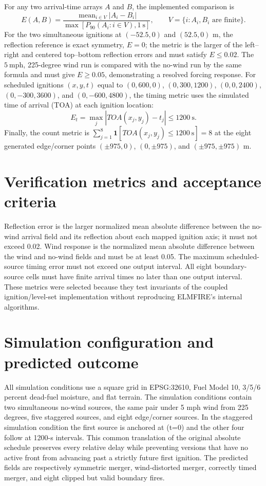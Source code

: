 For any two arrival-time arrays \(A\) and \(B\), the implemented comparison is
\[
 E(A,B)=\frac{\operatorname{mean}_{i\in V}|A_i-B_i|}
 {\max[P_{90}(A_i:i\in V),1~\mathrm{s}]},
 \qquad V=\{i:A_i,B_i\text{ are finite}\}.
\]
For the two simultaneous ignitions at \((-52.5,0)\) and \((52.5,0)\) m,
the reflection reference is exact symmetry, \(E=0\); the metric is the
larger of the left--right and centered top--bottom reflection errors and
must satisfy \(E\leq0.02\).  The \(5~\mathrm{mph}\), 225-degree wind run
is compared with the no-wind run by the same formula and must give
\(E\geq0.05\), demonstrating a resolved forcing response.
For scheduled ignitions \((x,y,t)\) equal to
\((0,600,0)\), \((0,300,1200)\), \((0,0,2400)\),
\((0,-300,3600)\), and \((0,-600,4800)\), the timing metric uses the
simulated time of arrival (TOA) at each ignition location:
\[
 E_t=\max_j|TOA(x_j,y_j)-t_j|\leq1200~\mathrm{s}.
\]
Finally, the count metric is
\(\sum_{j=1}^{8}\mathbf{1}[TOA(x_j,y_j)\leq1200~\mathrm{s}]=8\) at the
eight generated edge/corner points \((\pm975,0)\), \((0,\pm975)\), and
\((\pm975,\pm975)\) m.

\section{Verification metrics and acceptance criteria}

Reflection error is the larger normalized mean absolute difference between the no-wind arrival field and its reflection about each mapped ignition axis; it must not exceed 0.02. Wind response is the normalized mean absolute difference between the wind and no-wind fields and must be at least 0.05. The maximum scheduled-source timing error must not exceed one output interval. All eight boundary-source cells must have finite arrival times no later than one output interval. These metrics were selected because they test invariants of the coupled ignition/level-set implementation without reproducing ELMFIRE's internal algorithms.

\section{Simulation configuration and predicted outcome}

All simulation conditions use a \GridSpacing{} square grid in EPSG:32610, Fuel Model 10, 3/5/6 percent dead-fuel moisture, and flat terrain. The simulation conditions contain two simultaneous no-wind sources, the same pair under 5 mph wind from 225 degrees, five staggered sources, and eight edge/corner sources. In the staggered simulation condition the first source is anchored at (t=0) and the other four follow at 1200-s intervals. This common translation of the original absolute schedule preserves every relative delay while preventing versions that have no active front from advancing past a strictly future first ignition. The predicted fields are respectively symmetric merger, wind-distorted merger, correctly timed merger, and eight clipped but valid boundary fires.

